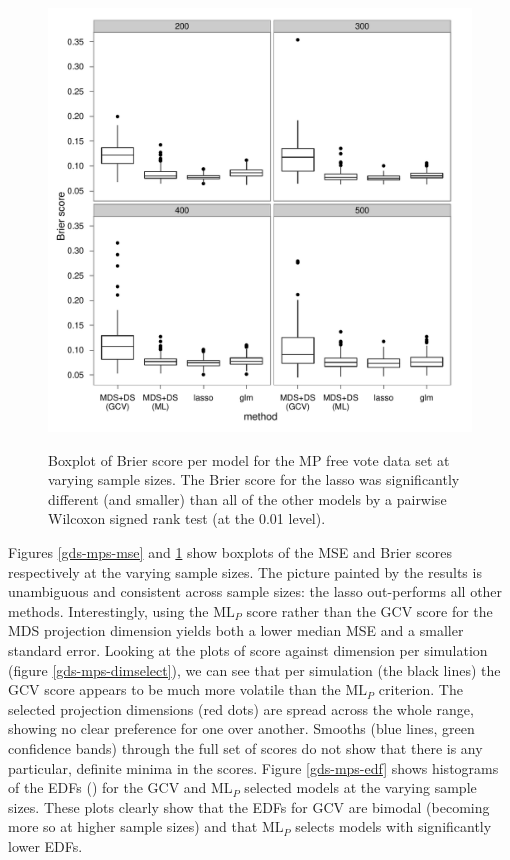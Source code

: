 \begin{figure}
\centering
\includegraphics[width=6in]{gds/figs/mp-brier.pdf} \\
\caption{Boxplot of Brier score per model for the MP free vote data set at varying sample sizes. The Brier score for the lasso was significantly different (and smaller) than all of the other models by a pairwise Wilcoxon signed rank test (at the 0.01 level).}
\label{gds-mps-brier}
\end{figure}

Figures \ref{gds-mps-mse} and \ref{gds-mps-brier} show boxplots of the MSE and Brier scores respectively at the varying sample sizes. The picture painted by the results is unambiguous and consistent across sample sizes: the lasso out-performs all other methods. Interestingly, using the $\text{ML}_P$ score rather than the GCV score for the MDS projection dimension yields both a lower median MSE and a smaller standard error. Looking at the plots of score against dimension per simulation (figure \ref{gds-mps-dimselect}), we can see that per simulation (the black lines) the GCV score appears to be much more volatile than the $\text{ML}_P$ criterion. The selected projection dimensions (red dots) are spread across the whole range, showing no clear preference for one over another. Smooths (blue lines, green confidence bands) through the full set of scores do not show that there is any particular, definite minima in the scores. Figure \ref{gds-mps-edf} shows histograms of the EDFs () for the GCV and $\text{ML}_P$ selected models at the varying sample sizes. These plots clearly show that the EDFs for GCV are bimodal (becoming more so at higher sample sizes) and that $\text{ML}_P$ selects models with significantly lower EDFs.

